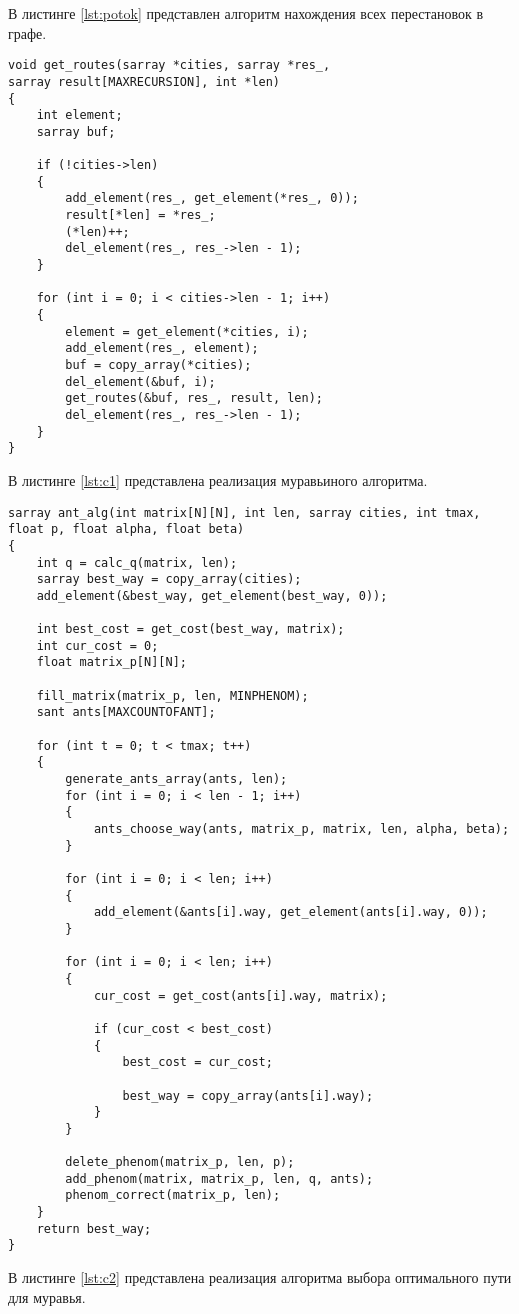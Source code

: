 В листинге \ref{lst:potok} представлен алгоритм нахождения всех перестановок в графе.

\begin{lstlisting}[label=lst:potok,caption=Реализация алгоритма нахождения всех перестановок в графе]
void get_routes(sarray *cities, sarray *res_,
sarray result[MAXRECURSION], int *len)
{
	int element;
	sarray buf;
	
	if (!cities->len)
	{
		add_element(res_, get_element(*res_, 0));
		result[*len] = *res_;
		(*len)++;
		del_element(res_, res_->len - 1);
	}

	for (int i = 0; i < cities->len - 1; i++)
	{
		element = get_element(*cities, i);
		add_element(res_, element);
		buf = copy_array(*cities);
		del_element(&buf, i);
		get_routes(&buf, res_, result, len);
		del_element(res_, res_->len - 1);
	}
}
\end{lstlisting}

В листинге \ref{lst:c1} представлена реализация муравьиного алгоритма.

\begin{lstlisting}[label=lst:c1,caption=Реализация муравьиного алгоритма]
sarray ant_alg(int matrix[N][N], int len, sarray cities, int tmax,
float p, float alpha, float beta)
{
	int q = calc_q(matrix, len);
	sarray best_way = copy_array(cities);
	add_element(&best_way, get_element(best_way, 0));

	int best_cost = get_cost(best_way, matrix);
	int cur_cost = 0;
	float matrix_p[N][N];

	fill_matrix(matrix_p, len, MINPHENOM);
	sant ants[MAXCOUNTOFANT];
	
	for (int t = 0; t < tmax; t++)
	{
		generate_ants_array(ants, len);
		for (int i = 0; i < len - 1; i++)
		{
			ants_choose_way(ants, matrix_p, matrix, len, alpha, beta);
		}
		
		for (int i = 0; i < len; i++)
		{
			add_element(&ants[i].way, get_element(ants[i].way, 0));
		}

		for (int i = 0; i < len; i++)
		{
			cur_cost = get_cost(ants[i].way, matrix);

			if (cur_cost < best_cost)
			{
				best_cost = cur_cost;

				best_way = copy_array(ants[i].way);
			}
		}

		delete_phenom(matrix_p, len, p);
		add_phenom(matrix, matrix_p, len, q, ants);
		phenom_correct(matrix_p, len);
	}
	return best_way;
}
\end{lstlisting}

В листинге \ref{lst:c2} представлена реализация алгоритма выбора оптимального пути для муравья.


